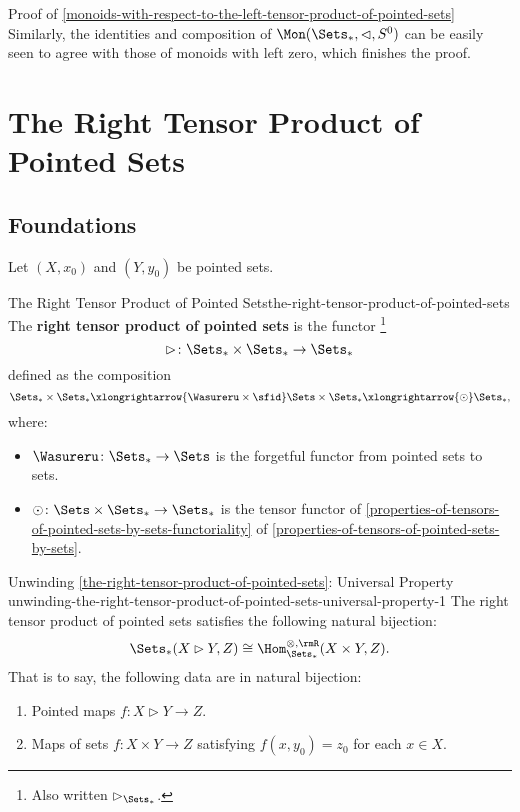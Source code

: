 \begin{Proof}{Proof of \cref{monoids-with-respect-to-the-left-tensor-product-of-pointed-sets}}
    Similarly, the identities and composition of $\Mon(\Sets_{*},\lhd,S^{0})$ can be easily seen to agree with those of monoids with left zero, which finishes the proof.
\end{Proof}
\section{The Right Tensor Product of Pointed Sets}\label{section-the-right-tensor-product-of-pointed-sets}
\subsection{Foundations}\label{subsection-the-right-tensor-product-of-pointed-sets-foundations}
Let $(X,x_{0})$ and $(Y,y_{0})$ be pointed sets.
\begin{definition}{The Right Tensor Product of Pointed Sets}{the-right-tensor-product-of-pointed-sets}%
    The \textbf{right tensor product of pointed sets} is the functor%
    \footnote{%
        Also written $\rhd_{\Sets_{*}}$.
        \par\vspace*{\TCBBoxCorrection}
    }%
    \[
        \rhd%
        \colon%
        \Sets_{*}\times\Sets_{*}%
        \to%
        \Sets_{*}%
    \]%
    defined as the composition
    \[
        \Sets_{*}\times\Sets_{*}%
        \xlongrightarrow{\Wasureru\times\sfid}%
        \Sets\times\Sets_{*}%
        \xlongrightarrow{\odot}%
        \Sets_{*},%
    \]%
    where:
    \begin{itemize}
        \item $\Wasureru\colon\Sets_{*}\to\Sets$ is the forgetful functor from pointed sets to sets.
        \item $\odot\colon\Sets\times\Sets_{*}\to\Sets_{*}$ is the tensor functor of \cref{properties-of-tensors-of-pointed-sets-by-sets-functoriality} of \cref{properties-of-tensors-of-pointed-sets-by-sets}.%
    \end{itemize}
\end{definition}
\begin{remark}{Unwinding \cref{the-right-tensor-product-of-pointed-sets}: Universal Property \rmI}{unwinding-the-right-tensor-product-of-pointed-sets-universal-property-1}%
    The right tensor product of pointed sets satisfies the following natural bijection:%
    \[%
        \Sets_{*}(X\rhd Y,Z)%
        \cong%
        \Hom^{\otimes,\rmR}_{\Sets_{*}}(X\times Y,Z).
    \]%
    That is to say, the following data are in natural bijection:
    \begin{enumerate}
        \item Pointed maps $f\colon X\rhd Y\to Z$.
        \item Maps of sets $f\colon X\times Y\to Z$ satisfying $f(x,y_{0})=z_{0}$ for each $x\in X$.
    \end{enumerate}
\end{remark}
